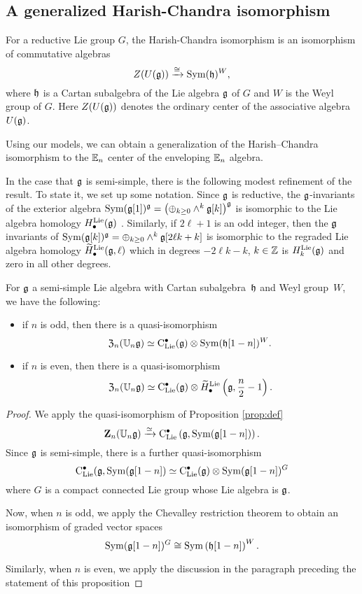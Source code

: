 \documentclass[11pt]{amsart}
\numberwithin{equation}{section}
\begin{document}
\subsection{A generalized Harish-Chandra isomorphism}

For a reductive Lie group $G$, the Harish-Chandra isomorphism is an isomorphism of commutative algebras
\[
Z(U(\mathfrak g)) \xrightarrow{\cong} {\rm Sym} (\mathfrak h)^W,
\]
where $\mathfrak h$ is a Cartan subalgebra of the Lie algebra $\mathfrak g$ of $G$ and $W$ is the Weyl group of $G$. 
Here $Z(U(\mathfrak g))$ denotes the ordinary center of the associative algebra~$U(\mathfrak g)$. 

Using our models, we can obtain a generalization of the Harish--Chandra isomorphism to the $\mathbb E_n$ center of the  enveloping $\mathbb E_n$ algebra. 

In the case that $\mathfrak g$ is semi-simple, there is the following modest refinement of the result. 
To state it, we set up some notation. 
Since $\mathfrak g$ is reductive, the $\mathfrak g$-invariants of the exterior algebra ${\rm Sym}(\mathfrak g[1])^\mathfrak g = \left(\oplus_{k \geq 0} \wedge^k \mathfrak g[k]\right)^\mathfrak g$ is isomorphic to the Lie algebra homology $H^{\rm Lie}_\bullet(\mathfrak g)$ \cite{Cartan}.
Similarly, if $2\ell+1$ is an odd integer, then the $\mathfrak g$ invariants of ${\rm Sym}(\mathfrak g[k])^\mathfrak g = \oplus_{k \geq 0} \wedge^k \mathfrak g[2 \ell k + k]$ is isomorphic to the regraded Lie algebra homology $\widetilde{H}_\bullet^{\rm Lie} (\mathfrak g, \ell)$
which in degrees $-2\ell k - k$, $k \in \mathbb Z$ is $H_{k}^{\rm Lie}(\mathfrak g)$ and zero in all other degrees.

\begin{prp}
For $\mathfrak g$ a semi-simple Lie algebra with Cartan subalgebra~$\mathfrak h$ and Weyl group~$W$, we have the following:
\begin{itemize}
\item if $n$ is odd, then there is a quasi-isomorphism 
\[
{\frak Z}_n(\mathbb U_n \mathfrak g) \simeq {\rm C}_{\rm Lie}^\bullet (\mathfrak g) \otimes {\rm Sym}(\mathfrak h[1-n])^W.
\]
\item if $n$ is even, then there is a quasi-isomorphism 
\[
{\frak Z}_n(\mathbb U_n \mathfrak g) \simeq {\rm C}_{\rm Lie}^\bullet (\mathfrak g) \otimes \widetilde{H}_\bullet^{\rm Lie} \left(\mathfrak g, \frac{n}{2} -1\right).
\]
\end{itemize}
\end{prp}
\begin{proof}
We apply the quasi-isomorphism of Proposition \ref{prop:def}
\[
\mathbf Z_n(\mathbb U_n \mathfrak g) \xrightarrow{\simeq} {\rm C}_{\rm Lie}^\bullet\left(\mathfrak g, {\rm Sym}(\mathfrak g[1-n]) \right) .
\]
Since $\mathfrak g$ is semi-simple, there is a further quasi-isomorphism
\[
{\rm C}_{\rm Lie}^\bullet(\mathfrak g, {\rm Sym}(\mathfrak g[1-n]) \simeq {\rm C}_{\rm Lie}^\bullet (\mathfrak g) \otimes {\rm Sym}(\mathfrak g[1-n])^G 
\]
where $G$ is a compact connected Lie group whose Lie algebra is $\mathfrak g$. 

Now, when $n$ is odd, we apply the Chevalley restriction theorem to obtain an isomorphism of graded vector spaces
\[
{\rm Sym}(\mathfrak g[1-n])^G \cong {\rm Sym} \left(\mathfrak h[1-n]\right)^W .
\]

Similarly, when $n$ is even, we apply the discussion in the paragraph preceding the statement of this proposition 
\end{proof}
\end{document}
